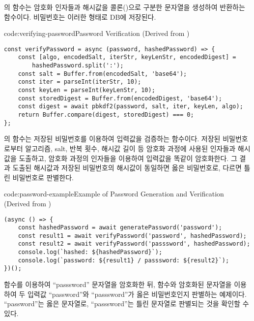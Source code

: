 의  함수는 암호화 인자들과 해시값을 콜론(\cd{:})으로 구분한 문자열을 생성하여 반환하는 함수이다. 비밀번호는 이러한 형태로 DB에 저장된다.
\clearpage

\begin{codeenv}{code:verifying-password}{Password Verification (Derived from )}\begin{verbatim}
const verifyPassword = async (password, hashedPassword) => {
    const [algo, encodedSalt, iterStr, keyLenStr, encodedDigest] =
        hashedPassword.split(':');
    const salt = Buffer.from(encodedSalt, 'base64');
    const iter = parseInt(iterStr, 10);
    const keyLen = parseInt(keyLenStr, 10);
    const storedDigest = Buffer.from(encodedDigest, 'base64');
    const digest = await pbkdf2(password, salt, iter, keyLen, algo);
    return Buffer.compare(digest, storedDigest) === 0;
};
\end{verbatim}
\end{codeenv}

의  함수는 저장된 비밀번호를 이용하여 입력값을 검증하는 함수이다. 저장된 비밀번호로부터 알고리즘, salt, 반복 횟수, 해시값 길이 등 암호화 과정에 사용된 인자들과 해시값을 도출하고, 암호화 과정의 인자들을 이용하여 입력값을 똑같이 암호화한다. 그 결과 도출된 해시값과 저장된 비밀번호의 해시값이 동일하면 옳은 비밀번호로, 다르면 틀린 비밀번호로 판별한다.

\begin{codeenv}{code:password-example}{Example of Password Generation and Verification (Derived from )}\begin{verbatim}
(async () => {
    const hashedPassword = await generatePassword('password');
    const result1 = await verifyPassword('password', hashedPassword);
    const result2 = await verifyPassword('passsword', hashedPassword);
    console.log(`hashed: ${hashedPassword}`);
    console.log(`password: ${result1} / passsword: ${result2}`);
})();
\end{verbatim}
\end{codeenv}

\은  함수를 이용하여 ``passsword'' 문자열을 암호화한 뒤,  함수와 암호화된 문자열을 이용하여 두 입력값 ``password''와 ``passsword''가 옳은 비밀번호인지 판별하는 예제이다. ``password''는 옳은 문자열로, ``passsword''는 틀린 문자열로 판별되는 것을 확인할 수 있다.
